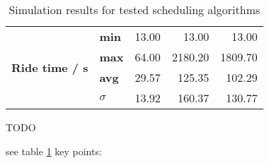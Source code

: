 \begin{table}[]
\begin{tabular}{llrrr}
\multirow{4}{*}{\textbf{Ride time / s}}        & \textbf{min}        & 13.00                                                                                                                                             & 13.00                                                                                                                                             & 13.00                                                                                                                                           \\
                                               & \textbf{max}        & 64.00                                                                                                                                             & 2180.20                                                                                                                                           & 1809.70                                                                                                                                         \\
                                               & \textbf{avg}        & 29.57                                                                                                                                             & 125.35                                                                                                                                            & 102.29                                                                                                                                          \\
                                               & \textbf{$ \sigma $} & 13.92                                                                                                                                             & 160.37                                                                                                                                            & 130.77                                                                                                                                         
\end{tabular}
\caption{\label{tab:impl:simulationresults} Simulation results for tested scheduling algorithms}
\end{table}
\endgroup

TODO

see table \ref{tab:impl:simulationresults}
key points:

